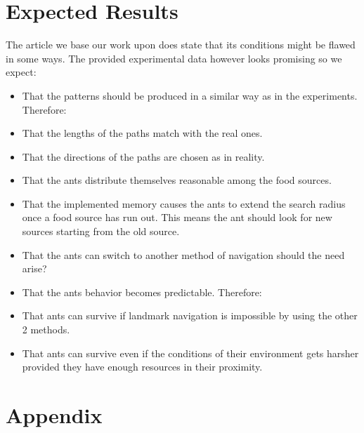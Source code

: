 \documentclass[11pt]{article}
\begin{document}
\section*{Expected Results}

The article we base our work upon does state that its conditions might be flawed in some ways. The provided experimental data however looks promising so we expect:
\begin{itemize}
\item That the patterns should be produced in a similar way as in the experiments. Therefore:
\item That the lengths of the paths match with the real ones.
\item That the directions of the paths are chosen as in reality.
\item That the ants distribute themselves reasonable among the food sources.
\item That the implemented memory causes the ants to extend the search radius once a food source has run out. This means the ant should look for new sources starting from the old source.
\item That the ants can switch to another method of navigation should the need arise?
\item That the ants behavior becomes predictable. Therefore:
\item That ants can survive if landmark navigation is impossible by using the other 2 methods.
\item That ants can survive even if the conditions of their environment gets harsher provided they have enough resources in their proximity.
\end{itemize}
























\newpage
\appendix
\section{Appendix}

\end{document}
